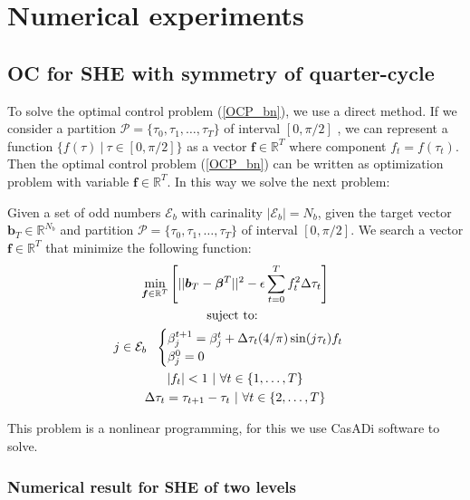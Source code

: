\section{Numerical experiments}

\subsection{OC for SHE with symmetry of quarter-cycle}
To solve the optimal control problem (\ref{OCP_bn}), we use a direct method. 
If we consider a partition $\mathcal{P} = \{\tau_0,\tau_1,\dots,\tau_{T}\}$ of interval $[0,\pi/2]$ , we can represent a function $\{ f(\tau) \ | \ \tau \in [0,\pi/2]\}$ as a vector $\bm{f} \in \mathbb{R}^{T}$ where component $f_t = f(\tau_t)$. Then the optimal control problem (\ref{OCP_bn}) can be written as optimization problem with variable $\bm{f} \in \mathbb{R}^{T}$. In this way we solve the next problem:

\begin{problem}
    Given  a set of odd numbers $\mathcal{E}_b$ with carinality $|\mathcal{E}_b| = N_b$, given the target vector $\bm{b}_T  \in \mathbb{R}^{N_b}$ and  partition $\mathcal{P} = \{\tau_0,\tau_1,\dots,\tau_{T}\}$ of interval $[0,\pi/2]$. We search a vector $\bm{f} \in \mathbb{R}^{T}$ that minimize the following function:
    \begin{gather}
        \min_{\bm{f} \in \mathbb{R}^{T} } \Bigg[ || \bm{b}_T - \bm{\beta}^{T}||^2 - \epsilon  \sum_{t=0}^{T} f_{t}^2 \Delta\tau_t  \Bigg]  \\
        \notag \text{suject to: } \\
        \notag j \in \mathcal{E}_b \ \ 
        \begin{cases}
            \beta_j^{t+1} = \beta_j^{t} + \Delta \tau_t (4/\pi) \sin(j\tau_t) f_t \\
            \beta_j^0 = 0
        \end{cases} \\
        \notag |f_t| < 1 \ | \ \forall t \in \{1,\dots,T\} \\
        \Delta \tau_t = \tau_{t+1} - \tau_{t} \ | \ \forall t \in \{2,\dots,T\}
    \end{gather}
\end{problem}

This problem is a nonlinear programming, for this we use CasADi software to solve.

\subsubsection{Numerical result for SHE of two levels}

